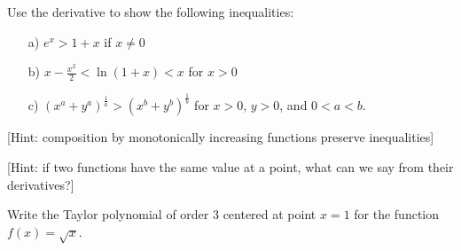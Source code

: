 \documentclass[11pt]{article}%
\begin{document}
\newpage

\begin{Exercise}[title=**]
	Use the derivative to show the following inequalities:
\begin{itemize}
	\item[a)]{$e^x>1+x$ if $x\neq 0$}
	\item[b)]{$x-\frac{x^2}{2}<\ln(1+x)<x$ for $x>0$}
	\item[c)]{$(x^a+y^a)^{\frac{1}{a}}>(x^b+y^b)^{\frac{1}{b}}$ for $x>0$, $y>0$, and $0<a<b$.}
\end{itemize} 

\bigskip

[Hint: composition by monotonically increasing functions preserve inequalities]

[Hint: if two functions have the same value at a point, what can we say from their derivatives?]
\end{Exercise}

\begin{Exercise}[title=*$\dagger$]
Write the Taylor polynomial of order 3 centered at point $x=1$ for the function $f(x)=\sqrt x$.
\end{Exercise}
\end{document}
